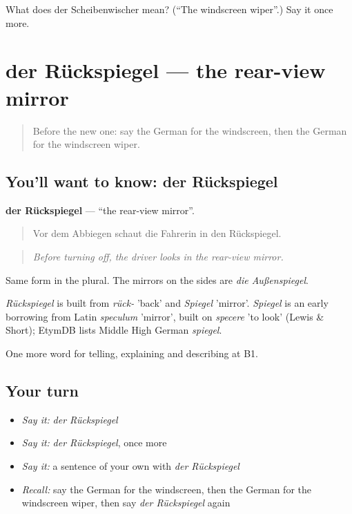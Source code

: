 \begin{tcolorbox}[breakable,colback=teal!4,colframe=teal!35!black,title={Before you move on}]
What does der Scheibenwischer mean? (\textquotedblleft{}The windscreen wiper\textquotedblright{}.) Say it once more.
\end{tcolorbox}
\section[der Rückspiegel]{der Rückspiegel — the rear-view mirror}

\label{lesson:GE-C400-rueckspiegel}



\begin{quote}
Before the new one: say the German for the windscreen, then the German for the windscreen wiper.
\end{quote}

\subsection*{You'll want to know: der Rückspiegel}
\textbf{der Rückspiegel} — \textquotedblleft{}the rear-view mirror\textquotedblright{}.

\begin{quote}
Vor dem Abbiegen schaut die Fahrerin in den Rückspiegel.
\end{quote}

\begin{quote}
\emph{Before turning off, the driver looks in the rear-view mirror.}
\end{quote}

Same form in the plural. The mirrors on the sides are \emph{die Außenspiegel}.

\begin{cousinweb}
\emph{Rückspiegel} is built from \emph{rück-} 'back' and \emph{Spiegel} 'mirror'. \emph{Spiegel} is an early borrowing from Latin \emph{speculum} 'mirror', built on \emph{specere} 'to look' (Lewis \& Short); EtymDB lists Middle High German \emph{spiegel}.
\end{cousinweb}

\begin{grammarlens}[title={What you've built}]
One more word for telling, explaining and describing at B1.
\end{grammarlens}

\subsection*{Your turn}
\begin{itemize}
\raggedright
  \item \emph{Say it:} \emph{der Rückspiegel}
  \item \emph{Say it:} \emph{der Rückspiegel}, once more
  \item \emph{Say it:} a sentence of your own with \emph{der Rückspiegel}
  \item \emph{Recall:} say the German for the windscreen, then the German for the windscreen wiper, then say \emph{der Rückspiegel} again
\end{itemize}

